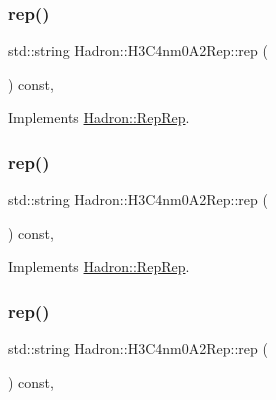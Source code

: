\subsubsection{\texorpdfstring{rep()}{rep()}\hspace{0.1cm}{\footnotesize\ttfamily [1/3]}}
{\footnotesize\ttfamily std\+::string Hadron\+::\+H3\+C4nm0\+A2\+Rep\+::rep (\begin{DoxyParamCaption}{ }\end{DoxyParamCaption}) const\hspace{0.3cm}{\ttfamily [inline]}, {\ttfamily [virtual]}}



Implements \mbox{\hyperlink{structHadron_1_1RepRep_ab3213025f6de249f7095892109575fde}{Hadron\+::\+Rep\+Rep}}.

\mbox{\label{structHadron_1_1H3C4nm0A2Rep_ab4e5ed700d7f03a7c2b8368304277671}} 
\subsubsection{\texorpdfstring{rep()}{rep()}\hspace{0.1cm}{\footnotesize\ttfamily [2/3]}}
{\footnotesize\ttfamily std\+::string Hadron\+::\+H3\+C4nm0\+A2\+Rep\+::rep (\begin{DoxyParamCaption}{ }\end{DoxyParamCaption}) const\hspace{0.3cm}{\ttfamily [inline]}, {\ttfamily [virtual]}}



Implements \mbox{\hyperlink{structHadron_1_1RepRep_ab3213025f6de249f7095892109575fde}{Hadron\+::\+Rep\+Rep}}.

\mbox{\label{structHadron_1_1H3C4nm0A2Rep_ab4e5ed700d7f03a7c2b8368304277671}} 
\subsubsection{\texorpdfstring{rep()}{rep()}\hspace{0.1cm}{\footnotesize\ttfamily [3/3]}}
{\footnotesize\ttfamily std\+::string Hadron\+::\+H3\+C4nm0\+A2\+Rep\+::rep (\begin{DoxyParamCaption}{ }\end{DoxyParamCaption}) const\hspace{0.3cm}{\ttfamily [inline]}, {\ttfamily [virtual]}}



